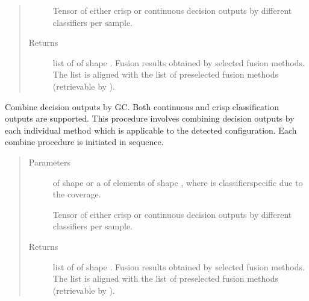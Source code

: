 \documentclass[letterpaper,10pt,english]{sphinxmanual}
\begin{document}
\begin{fulllineitems}
\begin{fulllineitems}
\begin{quote}
\begin{description}
\sphinxAtStartPar
Tensor of either crisp or continuous decision outputs by different classifiers per sample.


\item[{Returns}] \leavevmode
\sphinxAtStartPar
list of  of shape .
Fusion results obtained by selected fusion methods.
The list is aligned with the list of preselected fusion methods (retrievable by ).

\end{description}\end{quote}

\end{fulllineitems}


\begin{fulllineitems}
\label{\detokenize{pusion.auto.auto_combiner:pusion.auto.auto_combiner.AutoCombiner.combine_seq}}
\sphinxAtStartPar
Combine decision outputs by GC. Both continuous and crisp classification outputs are supported.
This procedure involves combining decision outputs by each individual method which is applicable
to the detected configuration. Each combine procedure is initiated in sequence.
\begin{quote}\begin{description}
\item[{Parameters}] \leavevmode
\sphinxAtStartPar
{} \textendash{} 
\sphinxAtStartPar
{} of shape  or a  of
 elements of shape , where  is classifier\sphinxhyphen{}specific
due to the coverage.

\sphinxAtStartPar
Tensor of either crisp or continuous decision outputs by different classifiers per sample.


\item[{Returns}] \leavevmode
\sphinxAtStartPar
list of  of shape .
Fusion results obtained by selected fusion methods.
The list is aligned with the list of preselected fusion methods (retrievable by ).


\end{description}
\end{quote}
\end{fulllineitems}
\end{fulllineitems}
\end{document}
